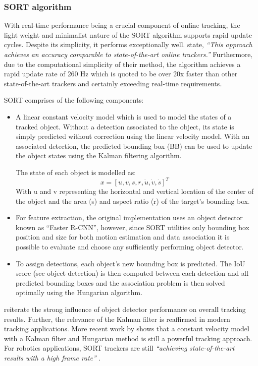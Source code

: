 \documentclass[a4paper,twoside,12pt]{report}
\begin{document}
\subsubsection{SORT algorithm}

With real-time performance being a crucial component of online tracking, the light weight and minimalist nature of the SORT algorithm supports rapid update cycles. Despite its simplicity, it performs exceptionally well. \cite{sort} state, \textit{``This approach achieves an accuracy comparable to state-of-the-art online trackers.''} Furthermore, due to the computational simplicity of their method, the algorithm achieves a rapid update rate of 260 Hz which is quoted to be over 20x faster than other state-of-the-art trackers and certainly exceeding real-time requirements.

SORT comprises of the following components:
\begin{itemize}
	\item A linear constant velocity model which is used to model the states of a tracked object. Without a detection associated to the object, its state is simply predicted without correction using the linear velocity model. With an associated detection, the predicted bounding box (BB) can be used to update the object states using the Kalman filtering algorithm.

	The state of each object is modelled as:
\begin{equation}
x = [u,v,s,r,\dot{u},\dot{v},\dot{s}]^T
\end{equation}
With u and v representing the horizontal and vertical location of the center of the object and the area (s) and aspect ratio (r) of the target’s bounding box.

	\item For feature extraction, the original implementation uses an object detector known as ``Faster R-CNN'', however, since SORT utilities only bounding box position and size for both motion estimation and data association \citep{sort} it is possible to evaluate and choose any sufficiently performing object detector.
	\item To assign detections, each object's new bounding box is predicted. The IoU score (see object detection) is then computed between each detection and all predicted bounding boxes and the association problem is then solved optimally using the Hungarian algorithm.
\end{itemize}

\cite{sort} reiterate the strong influence of object detector performance on overall tracking results. Further, the relevance of the Kalman filter is reaffirmed in modern tracking applications. More recent work by \cite{sort++} shows that a constant velocity model with a Kalman filter and Hungarian method is still a powerful tracking approach. For robotics applications, SORT trackers are still \textit{``achieving state-of-the-art results with a high frame rate''} \citep{sortrob}.
\end{document}
